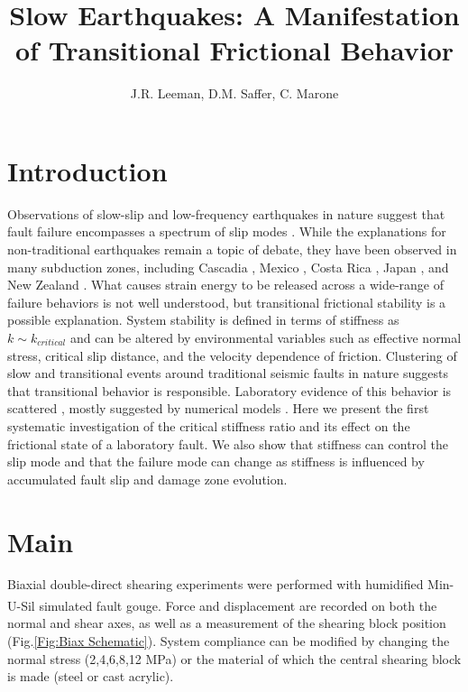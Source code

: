 \documentclass[11pt]{article}
\title{Slow Earthquakes: A Manifestation of Transitional Frictional Behavior}
\author{J.R. Leeman, D.M. Saffer, C. Marone}
\date{} %
\begin{document}
\maketitle

\section{Introduction}
Observations of slow-slip and low-frequency earthquakes in nature suggest that
fault failure encompasses a spectrum of slip modes \cite{Peng:2010, Ide:2007,
Beroza:2011}.  While the explanations for non-traditional earthquakes remain a
topic of debate, they have been observed in many subduction zones, including
Cascadia \cite{Miller:2002, Rogers:2003}, Mexico \cite{Kostoglodov:2003}, Costa
Rica \cite{Jiang:2012}, Japan \cite{Ito:2006}, and New Zealand
\cite{Wallace:2010}. What causes strain energy to be released across a
wide-range of failure behaviors is not well understood, but transitional
frictional stability is a  possible explanation. System stability is defined in
terms of stiffness as $k \sim k_{critical}$ \cite{Gu:1984} and can be altered by
environmental variables such as effective normal stress, critical slip distance,
and the velocity dependence of friction. Clustering of slow and transitional
events around traditional seismic faults in nature suggests that transitional
behavior is responsible. Laboratory evidence of this behavior is scattered
\cite{Kaproth:2013, Baumberger:1994, Leeman:2015}, mostly suggested by numerical
models \cite{Gu:1984}. Here we present the first systematic investigation of the
critical stiffness ratio and its effect on the frictional state of a laboratory
fault. We also show that stiffness can control the slip mode and that the
failure mode can change as stiffness is influenced by accumulated fault slip and
damage zone evolution.


\section{Main}
Biaxial double-direct shearing experiments were performed with humidified
Min-U-Sil\textsuperscript{\textregistered} simulated fault gouge. Force and
displacement are recorded on both the normal and shear axes, as well as a measurement of the shearing
block position (Fig.\ref{Fig:Biax Schematic}). System compliance can be modified
by changing the normal stress (2,4,6,8,12 MPa) or the material of which the
central shearing block is made (steel or cast acrylic).
\end{document}
